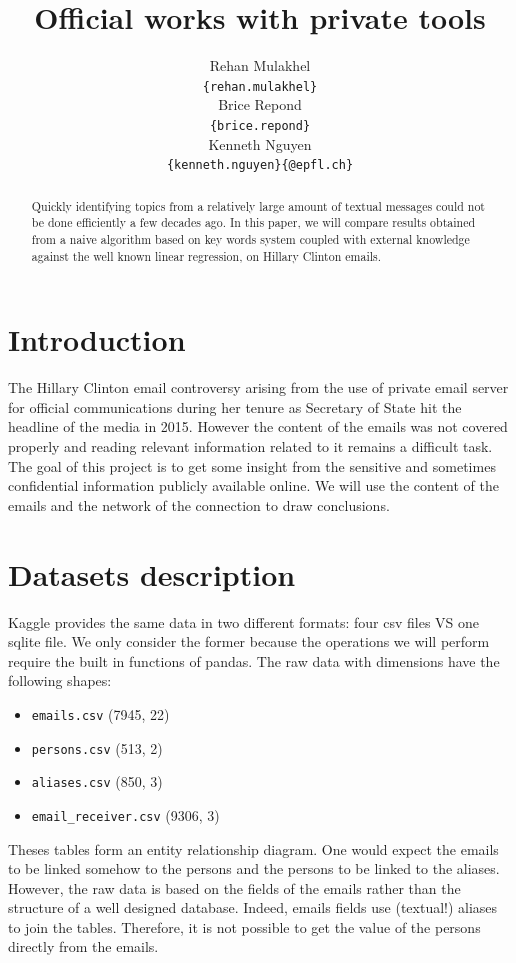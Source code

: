 \documentclass[11pt]{article}
\title{Official works with private tools}
\author{Rehan Mulakhel \\
  {\tt \{rehan.mulakhel\}} \\\And
  Brice Repond \\
  {\tt \{brice.repond\}} \\\And
  Kenneth Nguyen \\
{\tt \{kenneth.nguyen\}\{@epfl.ch\}} \\}
\date{}
\begin{document}
\maketitle
\begin{abstract}
Quickly identifying topics from a relatively large amount of textual messages could not be done efficiently a few decades ago. In this paper, we will compare results obtained from a naive algorithm based on key words system coupled with external knowledge against the well known linear regression, on Hillary Clinton emails. 
\end{abstract}

\section{Introduction}

The Hillary Clinton email controversy arising from the use of private email server for official communications during her tenure as Secretary of State hit the headline of the media in 2015. However the content of the emails was not covered properly and reading relevant information related to it remains a difficult task. The goal of this project is to get some insight from the sensitive and sometimes confidential information publicly available online. We will use the content of the emails and the network of the connection to draw conclusions.

\section{Datasets description}

Kaggle provides the same data in two different formats: four csv files VS one sqlite file. We only consider the former because the operations we will perform require the built in functions of pandas. The raw data with dimensions have the following shapes:

\begin{itemize}
    \item \texttt{emails.csv} (7945, 22)
    \item \texttt{persons.csv} (513, 2)
    \item \texttt{aliases.csv} (850, 3)
    \item \texttt{email\_receiver.csv} (9306, 3)
\end{itemize}

Theses tables form an entity relationship diagram. One would expect the emails to be linked somehow to the persons and the persons to be linked to the aliases. However, the raw data is based on the fields of the emails rather than the structure of a well designed database. Indeed, emails fields use (textual!) aliases to join the tables. Therefore, it is not possible to get the value of the persons directly from the emails.
\end{document}
